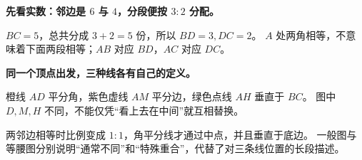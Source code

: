 \clearpage
\begin{explanationbox}
\textbf{先看实数：邻边是 $6$ 与 $4$，分段便按 $3:2$ 分配。}

$BC=5$，总共分成 $3+2=5$ 份，所以 $BD=3,DC=2$。
$A$ 处两角相等，不意味着下面两段相等；$AB$ 对应 $BD$，$AC$ 对应 $DC$。

\textbf{同一个顶点出发，三种线各有自己的定义。}

橙线 $AD$ 平分角，紫色虚线 $AM$ 平分边，绿色点线 $AH$ 垂直于 $BC$。
图中 $D,M,H$ 不同，不能仅凭“看上去在中间”就互相替换。


两邻边相等时比例变成 $1:1$，角平分线才通过中点，并且垂直于底边。
一般图与等腰图分别说明“通常不同”和“特殊重合”，代替了对三条线位置的长段描述。
\end{explanationbox}
